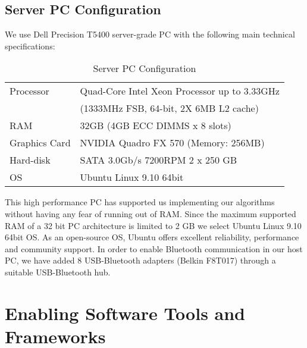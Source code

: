 \subsection{Server PC Configuration}
We use Dell  Precision T5400 server-grade PC with the following main technical specifications:
\begin{table}
\caption{Server PC Configuration}
\label{table:server-pc}
\begin{center}
\begin{tabular}{|l||l|}
\hline Processor & Quad-Core Intel Xeon Processor up to 3.33GHz\\ 
& (1333MHz FSB, 64-bit, 2X 6MB L2 cache)\\
\hline RAM & 32GB (4GB ECC DIMMS x 8 slots)\\
\hline Graphics Card & NVIDIA Quadro FX 570 (Memory: 256MB)\\
\hline Hard-disk &  SATA 3.0Gb/s 7200RPM  2 x 250 GB\\
\hline OS & Ubuntu Linux 9.10 64bit\\
\hline
\end{tabular}
\end{center}
\end{table}
This high performance PC has supported us implementing our algorithms without having any fear of running out of RAM.  Since the maximum supported RAM of a 32 bit PC architecture is limited to 2 GB we select Ubuntu Linux 9.10 64bit OS.  As an open-source OS,  Ubuntu offers excellent reliability, performance and community support. In order to enable Bluetooth communication in our host PC, we have added 8 USB-Bluetooth adapters (Belkin F8T017) through a suitable USB-Bluetooth hub. 
\section{Enabling Software Tools and Frameworks}
